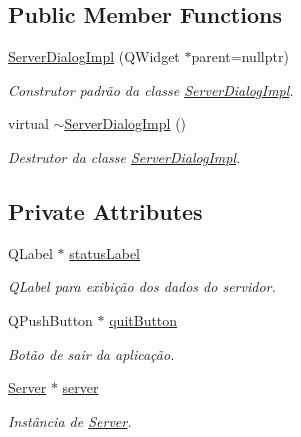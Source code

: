 \subsection*{Public Member Functions}
\begin{DoxyCompactItemize}
\item 
\hyperlink{classServerDialogImpl_a5a5cf39e32c0559a8fcdeb372fb055b3}{Server\+Dialog\+Impl} (Q\+Widget $\ast$parent=nullptr)
\begin{DoxyCompactList}\small\item\em Construtor padrão da classe \hyperlink{classServerDialogImpl}{Server\+Dialog\+Impl}. \end{DoxyCompactList}\item 
virtual \hyperlink{classServerDialogImpl_a0e73fbf7d75d033ec4ec12dc93931952}{$\sim$\+Server\+Dialog\+Impl} ()\hypertarget{classServerDialogImpl_a0e73fbf7d75d033ec4ec12dc93931952}{}\label{classServerDialogImpl_a0e73fbf7d75d033ec4ec12dc93931952}

\begin{DoxyCompactList}\small\item\em Destrutor da classe \hyperlink{classServerDialogImpl}{Server\+Dialog\+Impl}. \end{DoxyCompactList}\end{DoxyCompactItemize}
\subsection*{Private Attributes}
\begin{DoxyCompactItemize}
\item 
Q\+Label $\ast$ \hyperlink{classServerDialogImpl_a939de93eb188fe551041eb94531072af}{status\+Label}\hypertarget{classServerDialogImpl_a939de93eb188fe551041eb94531072af}{}\label{classServerDialogImpl_a939de93eb188fe551041eb94531072af}

\begin{DoxyCompactList}\small\item\em Q\+Label para exibição dos dados do servidor. \end{DoxyCompactList}\item 
Q\+Push\+Button $\ast$ \hyperlink{classServerDialogImpl_a620d45dc0aca6115b54502cf4939fa60}{quit\+Button}\hypertarget{classServerDialogImpl_a620d45dc0aca6115b54502cf4939fa60}{}\label{classServerDialogImpl_a620d45dc0aca6115b54502cf4939fa60}

\begin{DoxyCompactList}\small\item\em Botão de sair da aplicação. \end{DoxyCompactList}\item 
\hyperlink{classServer}{Server} $\ast$ \hyperlink{classServerDialogImpl_ad69d13de3b1f89c826bb5a5c82ee91fb}{server}\hypertarget{classServerDialogImpl_ad69d13de3b1f89c826bb5a5c82ee91fb}{}\label{classServerDialogImpl_ad69d13de3b1f89c826bb5a5c82ee91fb}

\begin{DoxyCompactList}\small\item\em Instância de \hyperlink{classServer}{Server}. \end{DoxyCompactList}\end{DoxyCompactItemize}
